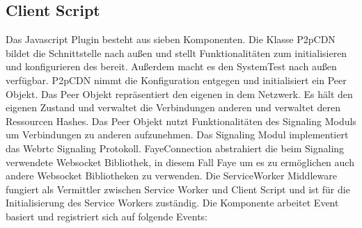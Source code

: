\subsection{Client Script}

Das Javascript Plugin besteht aus sieben Komponenten. Die Klasse P2pCDN bildet die Schnittstelle nach außen und stellt Funktionalitäten zum initialisieren und konfigurieren des \cdns bereit. Außerdem macht es den SystemTest nach außen verfügbar. P2pCDN nimmt die Konfiguration entgegen und initialisiert ein Peer Objekt. Das Peer Objekt repräsentiert den eigenen \client in dem \pTp Netzwerk. Es hält den eigenen Zustand und verwaltet die Verbindungen anderen \clients und verwaltet deren Ressourcen Hashes. Das Peer Objekt nutzt Funktionalitäten des Signaling Moduls um Verbindungen zu anderen \clients aufzunehmen. Das Signaling Modul implementiert das Webrtc Signaling Protokoll. FayeConnection abstrahiert die beim Signaling verwendete Websocket Bibliothek, in diesem Fall Faye um es zu ermöglichen auch andere Websocket Bibliotheken zu verwenden.
Die ServiceWorker Middleware fungiert als Vermittler zwischen Service Worker und Client Script und ist für die Initialisierung des Service Workers zuständig. Die Komponente arbeitet Event basiert und registriert sich auf folgende Events:
